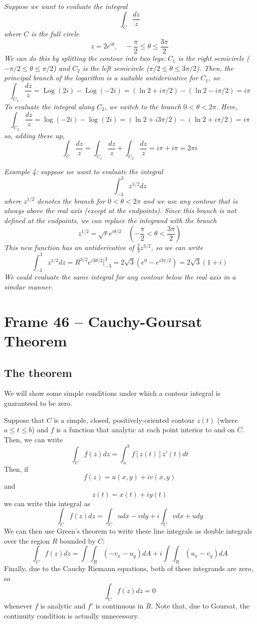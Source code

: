 \documentclass{article}
\DeclareMathOperator{\Log}{Log}
\begin{document}
\textit{Suppose we want to evaluate the integral
\[
	\int_C \frac{dz}{z} 
\]
where $C$ is the full circle
\[
	z = 2e^{i\theta},	\quad -\frac{\pi}{2} \le \theta \le \frac{3\pi}{2}
\]
We can do this by splitting the contour into two legs: $C_1$ is the right semicircle ($-\pi/2 \le \theta \le \pi/2$) and $C_2$ is the left semicircle ($\pi/2 \le \theta \le 3\pi/2$). Then, the principal branch of the logarithm is a suitable antiderivative for $C_1$, so
\[
	\int_{C_1} \frac{dz}{z}
	= \Log(2i) - \Log(-2i) 
	= (\ln 2 + i\pi/2) - (\ln 2 - i\pi/2)
	= i\pi
\]
To evaluate the integral along $C_2$, we switch to the branch $0 < \theta < 2\pi$. Here,
\[
	\int_{C_2} \frac{dz}{z}
	= \log(-2i) - \log(2i)
	= (\ln 2 + i3\pi/2) - (\ln 2 + i\pi/2) 
	= i\pi
\]
so, adding these up,
\[
	\int_C \frac{dz}{z}
	= \int_{C_1} \frac{dz}{z} + \int_{C_2} \frac{dz}{z} 
	= i \pi + i \pi
	= 2\pi i
\]}

\textit{Example 4: suppose we want to evaluate the integral
\[
	\int_{-3}^{3} z^{1/2} dz
\]
where $z^{1/2}$ denotes the branch for $0 < \theta < 2\pi$ and we use any contour that is always above the real axis (except at the endpoints). Since this branch is not defined at the endpoints, we can replace the integrand with the branch
\[
	z^{1/2} = \sqrt{r} e^{i\theta/2}
	\quad (-\frac{\pi}{2} < \theta < \frac{3\pi}{2})
\]
This new function has an antiderivative of $\frac{2}{3} z^{3/2}$, so we can write
\[
	\int_{-3}^{3} z^{1/2} dz
	= R^{3/2} e^{i3\theta/2} \Big|_{-3}^3
	= 2\sqrt{3} (e^0 - e^{i3\pi/2})
	= 2\sqrt{3} (1 + i)
\]	
We could evaluate the same integral for any contour below the real axis in a similar manner.}


\clearpage
\section{Frame 46 -- Cauchy-Goursat Theorem}
\subsection{The theorem}
We will show some simple conditions under which a contour integral is guaranteed to be zero.

Suppose that $C$ is a simple, closed, positively-oriented contour $z(t)$ (where $a \le t \le b$) and $f$ is a function that analytic at each point interior to and on $C$. Then, we can write
\[
	\int_C f(z) dz = \int_a^b f[z(t)] z'(t) dt
\]
Then, if
\[
	f(z) = u(x, y) + iv(x, y) 
\]
and
\[
	z(t) = x(t) + iy(t)
\]
we can write this integral as
\[
	\int_C f(z) dz = \int_C u dx - v dy + i\int_C v dx + u dy
\]
We can then use Green's theorem to write these line integrals as double integrals over the region $R$ bounded by $C$:
\[
	\int_C f(z) dz 
	=  \int \int_R (-v_x - u_y) dA 
	+ i\int \int_R  (u_x - v_y) dA 
\]
Finally, due to the Cauchy Riemann equations, both of these integrands are zero, so
\[
	\int_C f(z) dz = 0
\]
whenever $f$ is analytic and $f'$ is continuous in $R$. Note that, due to Goursat, the continuity condition is actually unnecessary.
\end{document}
